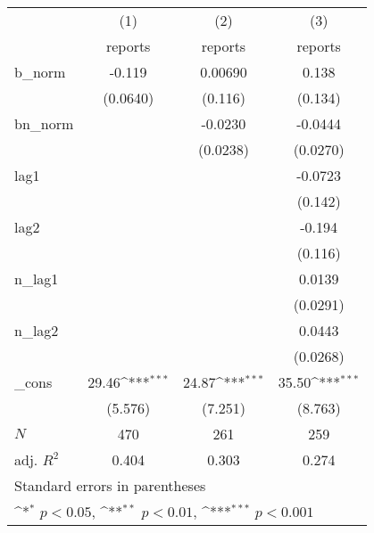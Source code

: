 {
\def\sym#1{\ifmmode^{#1}\else\(^{#1}\)\fi}
\begin{tabular}{l*{3}{c}}
\hline\hline
            &\multicolumn{1}{c}{(1)}&\multicolumn{1}{c}{(2)}&\multicolumn{1}{c}{(3)}\\
            &\multicolumn{1}{c}{reports}&\multicolumn{1}{c}{reports}&\multicolumn{1}{c}{reports}\\
\hline
b\_norm      &      -0.119         &     0.00690         &       0.138         \\
            &    (0.0640)         &     (0.116)         &     (0.134)         \\
[1em]
bn\_norm     &                     &     -0.0230         &     -0.0444         \\
            &                     &    (0.0238)         &    (0.0270)         \\
[1em]
lag1        &                     &                     &     -0.0723         \\
            &                     &                     &     (0.142)         \\
[1em]
lag2        &                     &                     &      -0.194         \\
            &                     &                     &     (0.116)         \\
[1em]
n\_lag1      &                     &                     &      0.0139         \\
            &                     &                     &    (0.0291)         \\
[1em]
n\_lag2      &                     &                     &      0.0443         \\
            &                     &                     &    (0.0268)         \\
[1em]
\_cons      &       29.46\sym{***}&       24.87\sym{***}&       35.50\sym{***}\\
            &     (5.576)         &     (7.251)         &     (8.763)         \\
\hline
\(N\)       &         470         &         261         &         259         \\
adj. \(R^{2}\)&       0.404         &       0.303         &       0.274         \\
\hline\hline
\multicolumn{4}{l}{\footnotesize Standard errors in parentheses}\\
\multicolumn{4}{l}{\footnotesize \sym{*} \(p<0.05\), \sym{**} \(p<0.01\), \sym{***} \(p<0.001\)}\\
\end{tabular}
}

